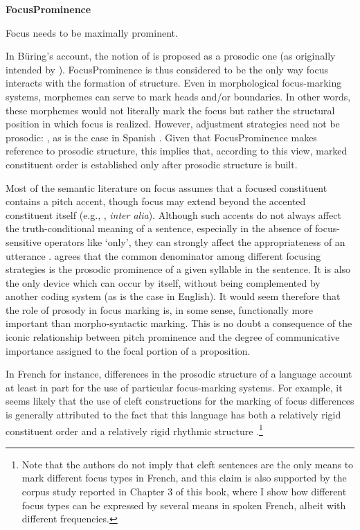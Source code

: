 \ea \textbf{FocusProminence}\\ \label{ex23}

Focus needs to be maximally prominent.
\z


 In Büring's account, the notion of  is proposed as a prosodic one (as originally intended by \cite{truckenbrodt1995phonological}). FocusProminence is thus considered to be the only way focus interacts with the formation of structure. Even in morphological focus-marking systems, morphemes can serve to mark heads and/or boundaries. In other words, these morphemes would not literally mark the focus but rather the structural position in which focus is realized.
However, adjustment strategies need not be prosodic:  \parencite[7]{buring2009towards}, as is the case in Spanish \parencite{zubizarreta1998prosody}. Given that FocusProminence makes reference to prosodic structure, this implies that, according to this view, marked constituent order is established only after prosodic structure is built.

Most of the semantic literature on focus assumes that a focused constituent contains a pitch accent, though focus may extend beyond the accented constituent itself (e.g., \cite{jackendoff1972semantic, selkirk2008contrastive}, \textit{inter alia}). Although such accents do not always affect the truth-conditional meaning of a sentence, especially in the absence of focus-sensitive operators like `only', they can strongly affect the appropriateness of an utterance \parencite{horn1981exhaustiveness, beaver2009sense}. \textcite{lambrecht1996information} agrees that the common denominator among different focusing strategies is the prosodic prominence of a given syllable in the sentence. It is also the only device which can occur by itself, without being complemented by another coding system (as is the case in English). It would seem therefore that the role of prosody in focus marking is, in some sense, functionally more important than morpho-syntactic marking. This is no doubt a consequence of the iconic relationship between pitch prominence and the degree of communicative importance assigned to the focal portion of a proposition. 

In French for instance, differences in the prosodic structure of a language account at least in part for the use of particular focus-marking systems. For example, it seems likely that the use of cleft constructions for the marking of focus differences is generally attributed to the fact that this language has both a relatively rigid constituent order and a relatively rigid rhythmic structure \parencite{dufter2003rhythmic}.\footnote{Note that the authors do not imply that cleft sentences are the only means to mark different focus types in French, and this claim is also supported by the corpus study reported in Chapter 3 of this book, where I show how different focus types can be expressed by several means in spoken French, albeit with different frequencies.}

